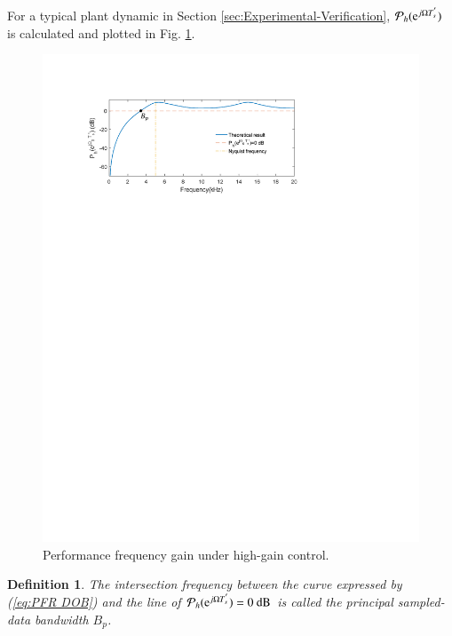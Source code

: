 \documentclass [11pt, proquest] {uwthesis}[2020/02/24]
\newtheorem{definition}{Definition}
\begin{document}
For a typical plant dynamic in Section \ref{sec:Experimental-Verification},
$\mathcal{P}_{h}(\mathrm{e}^{j\Omega T_{s}^{'}})$ is calculated and plotted
in Fig. \ref{fig:Performace-frequency-gain}. 
\begin{figure}[!ht]
\begin{centering}
\includegraphics[width=12cm]{Spectral-analysis/FIG9.pdf}
\par\end{centering}
\caption{\label{fig:Performace-frequency-gain}Performance frequency gain under
high-gain control.}
\end{figure}

\begin{definition}\label{enu:The-first-intersection}The intersection
frequency between the curve expressed by (\ref{eq:PFR DOB}) and the
line of $\mathcal{P}_{h}(\mathrm{e}^{j\Omega T_{s}^{'}})=\text{0 dB}$ is
called the \emph{principal sampled-data bandwidth} $B_{p}$. \end{definition} 
\end{document}
